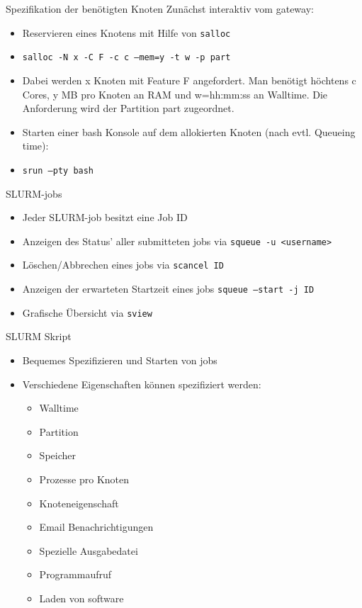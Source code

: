 \begin{frame}{Spezifikation der benötigten Knoten}
  Zunächst interaktiv vom gateway:
  \begin{itemize}
    \item Reservieren eines Knotens mit Hilfe von \texttt{salloc}
    \item \texttt{salloc -N x -C F -c c --mem=y -t w -p part}
    \item Dabei werden x Knoten mit Feature F angefordert. Man benötigt höchtens c Cores, y MB pro Knoten an RAM und w=hh:mm:ss an Walltime. Die Anforderung wird der Partition part zugeordnet.
    \item Starten einer bash Konsole auf dem allokierten Knoten (nach evtl. Queueing time):
    \item \texttt{srun --pty bash}
  \end{itemize}
\end{frame}

\begin{frame}{SLURM-jobs}
  \begin{itemize}
    \item Jeder SLURM-job besitzt eine Job ID
    \item Anzeigen des Status' aller submitteten jobs via \texttt{squeue -u <username>}
    \item Löschen/Abbrechen eines jobs via \texttt{scancel ID}
    \item Anzeigen der erwarteten Startzeit eines jobs \texttt{squeue --start -j ID}
    \item Grafische Übersicht via \texttt{sview}
  \end{itemize}
\end{frame}

\begin{frame}{SLURM Skript}
  \begin{itemize}
    \item Bequemes Spezifizieren und Starten von jobs
    \item Verschiedene Eigenschaften können spezifiziert werden:
    \begin{itemize}
      \item Walltime
      \item Partition
      \item Speicher
      \item Prozesse pro Knoten
      \item Knoteneigenschaft
      \item Email Benachrichtigungen
      \item Spezielle Ausgabedatei
      \item Programmaufruf
      \item Laden von software
    \end{itemize}
  \end{itemize}
\end{frame}

